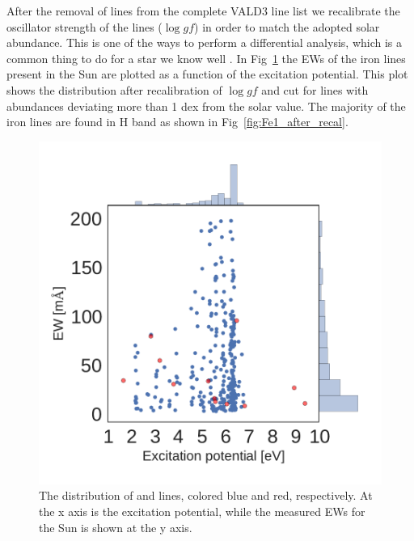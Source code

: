 \documentclass{aa}
\begin{document}
After the removal of lines from the complete VALD3 line list we
 recalibrate the oscillator strength of the lines ($\log
\mathit{gf}$) in order to match the adopted solar abundance. This is
one of the ways to perform a differential analysis, which is a common
thing to do for a star we know well \citep{Sousa2008a,Onehag2012}. In
Fig~\ref{fig:Fe1_before_recal} the EWs of the iron lines present in
the Sun are plotted as a function of the excitation potential. This
plot shows the distribution after recalibration of $\log gf$ and cut
for lines with abundances deviating more than 1 dex from the solar
value. The majority of the iron lines are found in H band as shown in
Fig~\ref{fig:Fe1_after_recal}.



\begin{figure}[tpb]
    \centering
    \includegraphics[width=1.0\linewidth]{figures/EWvsEP.pdf}
    \caption{The distribution of  and  lines,
    colored blue and red, respectively. At the x axis is
    the excitation potential, while the measured EWs for the Sun is
    shown at the y axis.}
    \label{fig:Fe1_before_recal}
\end{figure}
\end{document}
